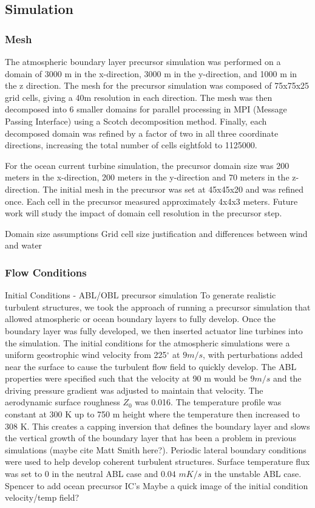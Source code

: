 \subsection{Simulation}


\subsubsection{Mesh}

The atmospheric boundary layer precursor simulation was performed on a domain of 3000 m in the x-direction, 3000 m in the y-direction, and 1000 m in the z direction.  The mesh for the precursor simulation was composed of 75x75x25 grid cells, giving a 40m resolution in each direction.  The mesh was then decomposed into 6 smaller domains for parallel processing in MPI (Message Passing Interface) using a Scotch decomposition method.  Finally, each decomposed domain was refined by a factor of two in all three coordinate directions, increasing the total number of cells eightfold to 1125000. 

For the ocean current turbine simulation, the precursor domain size was 200 meters in the x-direction, 200 meters in the y-direction and 70 meters in the z-direction. The initial mesh in the precursor was set at 45x45x20 and was refined once. Each cell in the precursor measured approximately 4x4x3 meters. Future work will study the impact of domain cell resolution in the precursor step.


Domain size assumptions
Grid cell size justification and differences between wind and water

\subsubsection{Flow Conditions}

Initial Conditions - ABL/OBL precursor simulation
To generate realistic turbulent structures, we took the approach of running a precursor simulation that allowed atmospheric or ocean boundary layers to fully develop.  Once the boundary layer was fully developed, we then inserted actuator line turbines into the simulation.  The initial conditions for the atmospheric simulations were a uniform geostrophic wind velocity from 225$^\circ$  at $9 m/s$, with perturbations added near the surface to cause the turbulent flow field to quickly develop.  The ABL properties were specified such that the velocity at 90 m would be $9 m/s$ and the driving pressure gradient was adjusted to maintain that velocity.  The aerodynamic surface roughness $Z_{0}$ was 0.016.  The temperature profile was constant at 300 K up to 750 m height where the temperature then increased to 308 K.  This creates a capping inversion that defines the boundary layer and slows the vertical growth of the boundary layer that has been a problem in previous simulations (maybe cite Matt Smith here?).  Periodic lateral boundary conditions were used to help develop coherent turbulent structures.  Surface temperature flux was set to 0 in the neutral ABL case and $0.04$ $mK/s$ in the unstable ABL case.
%
Spencer to add ocean precursor IC's
Maybe a quick image of the initial condition velocity/temp field?

